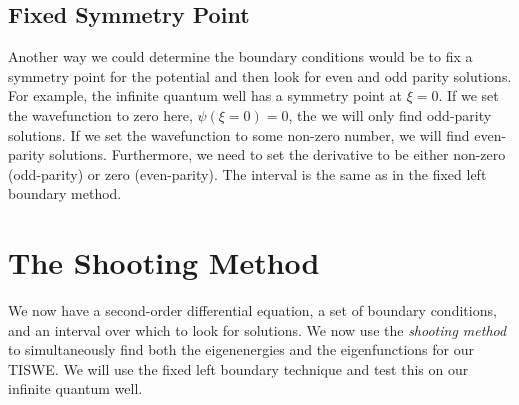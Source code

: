 \subsection{Fixed Symmetry Point}
Another way we could determine the boundary conditions would be to fix a symmetry point for the potential and then look for even and odd parity solutions. For example, the infinite quantum well has a symmetry point at $\xi = 0$. If we set the wavefunction to zero here, $\psi(\xi=0)=0$, the we will only find odd-parity solutions. If we set the wavefunction to some non-zero number, we will find even-parity solutions. Furthermore, we need to set the derivative to be either non-zero (odd-parity) or zero (even-parity). The interval is the same as in the fixed left boundary method.

\section{The Shooting Method}
We now have a second-order differential equation, a set of boundary conditions, and an interval over which to look for solutions. We now use the {\em shooting method} to simultaneously find both the eigenenergies and the eigenfunctions for our TISWE. We will use the fixed left boundary technique and test this on our infinite quantum well.

